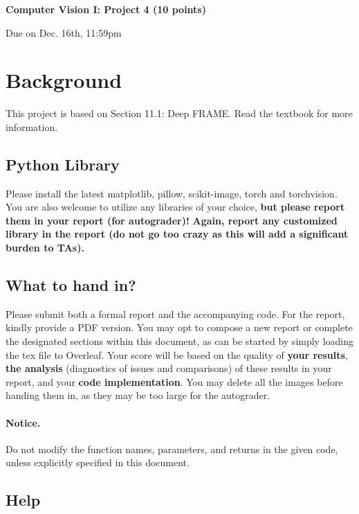 \documentclass[11pt]{article}
\begin{document}
\begin{center}
{\bf\Large Computer Vision I: Project 4 (10 points)}

\vspace{1em}
Due on Dec. 16th, 11:59pm
\end{center}

\section{Background} 

This project is based on Section 11.1: Deep FRAME. Read the textbook for more information.

\subsection{Python Library}

Please install the latest matplotlib, pillow, scikit-image, torch and torchvision. You are also welcome to utilize any libraries of your choice, \textbf{but please report them in your report (for autograder)!}
\color{red}
\textbf{Again, report any customized library in the report (do not go too crazy as this will add a significant burden to TAs).}
\color{black}

\subsection{What to hand in?}

Please submit both a formal report and the accompanying code. For the report, kindly provide a PDF version. You may opt to compose a new report or complete the designated sections within this document, as can be started by simply loading the tex file to Overleaf. Your score will be based on the quality of \textbf{your results}, \textbf{the analysis} (diagnostics of issues and comparisons) of these results in your report, and your \textbf{code implementation}. You may delete all the images before handing them in, as they may be too large for the autograder.

\paragraph{Notice.} Do not modify the function names, parameters, and returns in the given code, unless explicitly specified in this document.

\subsection{Help}
\end{document}
